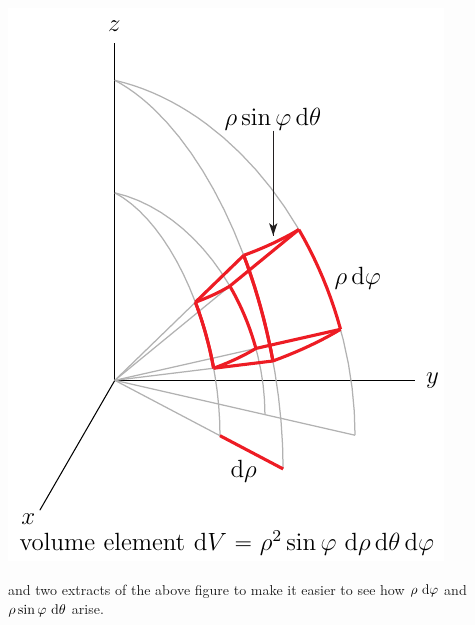 \begin{efig}
\begin{center}
    \includegraphics{spher5.pdf}
\end{center}
\end{efig}
and two extracts of the above figure to make it easier to see 
how $\rho\ \mathrm{d}\varphi$ and $\rho\sin\varphi\ \mathrm{d}\theta$ arise.
